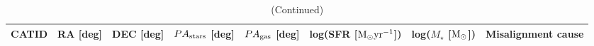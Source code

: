 \documentclass[fleqn,usenatbib]{mnras}
\begin{document}
\renewcommand\tablename{C1}

\renewcommand\thetable{{\ref{tab:TableA2}}}
\setlength{\tabcolsep}{9.3pt} %
\renewcommand{\arraystretch}{1.2}
\begin{table}
\centering
\caption{(Continued)}\label{tab:TableA3}
\setcounter{table}{30}
\begin{tabular*}{\linewidth}{cccccccc}
\hline
\multicolumn{1}{l}{CATID} & \multicolumn{1}{l}{RA [deg]} & \multicolumn{1}{l}{DEC [deg]} & \multicolumn{1}{l}{$PA_{\rm{stars}}$ [deg]} & \multicolumn{1}{l}{$PA_{\rm{gas}}$ [deg]} & \multicolumn{1}{l}{log(SFR [$\rm{M_{\odot}yr^{-1}}$])} & \multicolumn{1}{l}{log($M_{\star}$ [$\rm{M_{\odot}}$])} & \multicolumn{1}{l}{Misalignment cause} \\
\hline


\end{tabular*}
\end{table}
\end{document}
